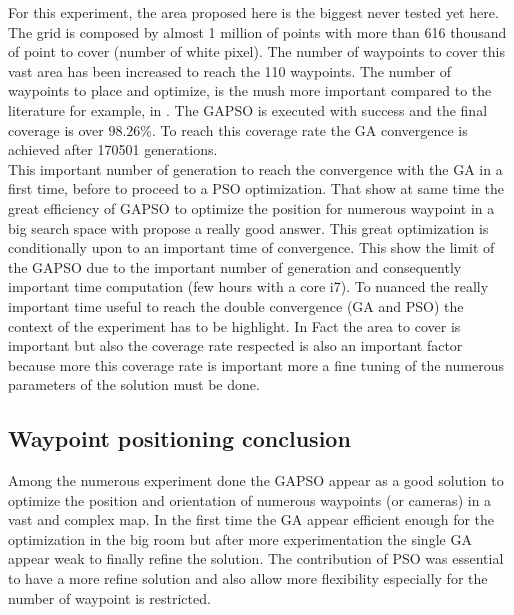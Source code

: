 For this  experiment, the area proposed here is the biggest never tested yet here. The grid is composed by almost 1 million of points with more than 616 thousand of point to cover (number of white pixel). The number of waypoints to cover this vast area has  been increased to reach  the  110 waypoints. The number of waypoints to  place and optimize, is the mush more important compared to the literature for example, in \citep{8*zhou2011,33*reddy2012}.
The GAPSO is executed with success and the final coverage is  over $98.26\%$.  
	 To reach this coverage rate the GA convergence is achieved after 170501 generations. \\
	 This important number of generation to reach the convergence with the GA in a first time, before to proceed to a PSO optimization. That show at same time the great efficiency of GAPSO to optimize the position for numerous waypoint in a big search space with propose a really good answer. This great optimization is conditionally upon to an important time of convergence. This show the limit of the GAPSO due to the important number of generation and consequently important time computation (few hours with a core i7).  
	 To nuanced the really important time useful to reach the double convergence (GA and PSO) the context of the experiment has to be highlight. In Fact the area to cover is important but  also the coverage rate respected is also an important factor because more this coverage rate is important more a fine tuning of the numerous parameters of the solution must be done.
	
	\subsection{Waypoint positioning conclusion} 
	
Among the numerous experiment done the GAPSO appear as a good solution to optimize the position and orientation of numerous waypoints (or cameras)  in a vast and complex map.
In the first time the GA appear efficient enough  for the  optimization in the big room  but after more experimentation the single GA appear weak to finally refine the solution.  The contribution of PSO was essential to have a more refine solution and also allow more flexibility especially for the number of waypoint is restricted.



